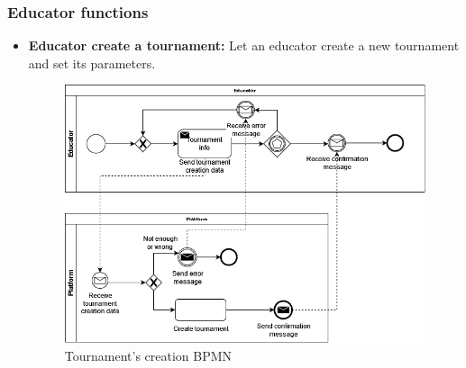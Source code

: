 \documentclass{article}
\begin{document}
{\subsubsection{Educator functions}
\begin{itemize}
    \item \textbf{Educator create a tournament:} Let an educator create a new tournament and set its parameters.
          \begin{figure}[H]
              \centering
              \includegraphics[scale=0.35]{images/BPMN/BPMN8.png}
              \caption{Tournament's creation BPMN}
              \label{fig:TournamentCreationBPMN}
          \end{figure}


\end{itemize}}
\end{document}
